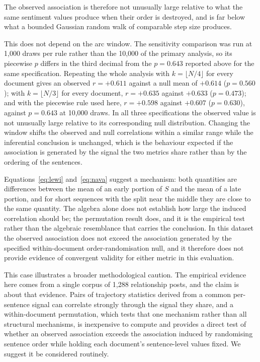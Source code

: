 \documentclass[fleqn,10pt]{wlscirep}
\begin{document}
The observed association is therefore not unusually large relative to what the same sentiment values produce when their order is destroyed, and is far below what a bounded Gaussian random walk of comparable step size produces.

This does not depend on the arc window. The sensitivity comparison was run at 1{,}000 draws per rule rather than the 10{,}000 of the primary analysis, so its piecewise $p$ differs in the third decimal from the $p=0.643$ reported above for the same specification. Repeating the whole analysis with $k=\lfloor N/4 \rfloor$ for every document gives an observed $r=+0.611$ against a null mean of $+0.614$ ($p=0.560$); with $k=\lfloor N/3 \rfloor$ for every document, $r=+0.635$ against $+0.633$ ($p=0.473$); and with the piecewise rule used here, $r=+0.598$ against $+0.607$ ($p=0.630$), against $p=0.643$ at 10{,}000 draws. In all three specifications the observed value is not unusually large relative to its corresponding null distribution. Changing the window shifts the observed and null correlations within a similar range while the inferential conclusion is unchanged, which is the behaviour expected if the association is generated by the signal the two metrics share rather than by the ordering of the sentences.

Equations~\eqref{eq:lewi} and~\eqref{eq:nava} suggest a mechanism: both quantities are differences between the mean of an early portion of $S$ and the mean of a late portion, and for short sequences with the split near the middle they are close to the same quantity. The algebra alone does not establish how large the induced correlation should be; the permutation result does, and it is the empirical test rather than the algebraic resemblance that carries the conclusion. In this dataset the observed association does not exceed the association generated by the specified within-document order-randomisation null, and it therefore does not provide evidence of convergent validity for either metric in this evaluation.

This case illustrates a broader methodological caution. The empirical evidence here comes from a single corpus of 1{,}288 relationship posts, and the claim is about that evidence. Pairs of trajectory statistics derived from a common per-sentence signal can correlate strongly through the signal they share, and a within-document permutation, which tests that one mechanism rather than all structural mechanisms, is inexpensive to compute and provides a direct test of whether an observed association exceeds the association induced by randomising sentence order while holding each document's sentence-level values fixed. We suggest it be considered routinely.
\end{document}
